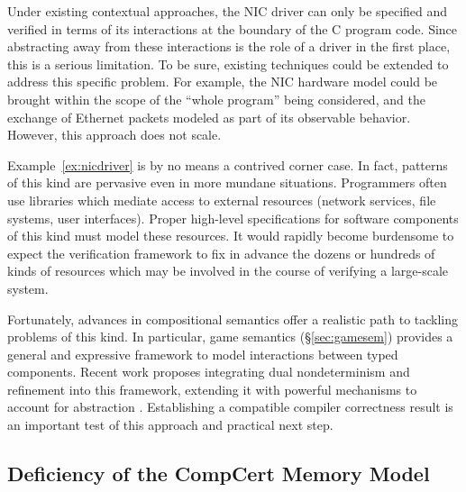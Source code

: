 Under existing contextual approaches, the NIC driver can only be
specified and verified in terms of its interactions at the boundary of
the C program code.  Since abstracting away from these interactions is
the role of a driver in the first place, this is a serious limitation.
To be sure, existing techniques could be extended to address this
specific problem.  For example, the NIC hardware model could be
brought within the scope of the ``whole program'' being considered,
and the exchange of Ethernet packets modeled as part of its observable
behavior.  However, this approach does not scale.

Example~\ref{ex:nicdriver} is by no means a contrived corner case. In
fact, patterns of this kind are pervasive even in more mundane
situations.  Programmers often use libraries which mediate access to
external resources (network services, file systems, user interfaces).
Proper high-level specifications for software components of this kind
must model these resources.  It would rapidly become burdensome to
expect the verification framework to fix in advance the dozens or
hundreds of kinds of resources which may be involved in the course of
verifying a large-scale system.

Fortunately, advances in compositional semantics offer a realistic
path to tackling problems of this kind.  In particular, game semantics
(\S\ref{sec:gamesem}) provides a general and expressive framework to
model interactions between typed components.  Recent work proposes
integrating dual nondeterminism and refinement into this framework,
extending it with powerful mechanisms to account for abstraction
\cite{rbgs-cal,layered22}.  Establishing a compatible compiler
correctness result is an important test of this approach and practical
next step.

\subsection{Deficiency of the CompCert Memory Model}
\label{ssec:intro-nmm}

